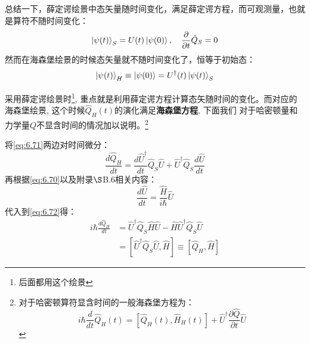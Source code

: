 \documentclass[a4paper,zihao=-4,linespread=1]{ctexrep}
\begin{document}
    总结一下，薛定谔绘景中态矢量随时间变化，满足薛定谔方程，而可观测量，也就是算符不随时间变化：
    \[\ket{\psi(t)}_S=U(t)\ket{\psi(0)},\quad \frac{\partial}{\partial t}\hat{Q}_S=0\]
    然而在海森堡绘景的时候态矢量就不随时间变化了，恒等于初始态：
    \[\ket{\psi(t)}_H\equiv \ket{\psi(0)}=U^\dagger(t)\ket{\psi(t)}_S\]
    
    采用薛定谔绘景时\footnote{后面都用这个绘景}, 重点就是利用薛定谔方程计算态矢随时间的变化。而对应的海森堡绘景, 这个时候$\hat{Q}_H(t)$的演化满足\textbf{海森堡方程}, 下面我们
    对于哈密顿量和力学量$Q$不显含时间的情况加以说明。\footnote{对于哈密顿算符显含时间的一般海森堡方程为：\[i \hbar \frac{d}{d t} \hat{Q}_{H}(t)=\left[\hat{Q}_{H}(t), \hat{H}_{H}(t)\right]+\hat{U}^{\dagger} \frac{\partial \hat{Q}}{\partial t} \hat{U}\]}

    将\ref{eq:6.71}两边对时间微分：
    \begin{equation}
        \label{eq:6.72}
        \frac{d\hat{Q}_H}{dt}=\frac{d\hat{U}^\dagger}{dt}\hat{Q}_S\hat{U}+\hat{U}^\dagger\hat{Q}_S\frac{d\hat{U}}{dt}
    \end{equation}
    再根据\ref{eq:6.70}以及附录$\S$B.6相关内容：
    \begin{equation}
        \frac{d\hat{U}}{dt}=\frac{\hat{H}}{i\hbar}\hat{U}
    \end{equation}
    代入到\ref{eq:6.72}得：
    \begin{align*}
        i\hbar\frac{d\hat{Q}_H}{dt}&=\hat{U}^\dagger\hat{Q}_S\hat{H}\hat{U}-\hat{H}\hat{U}^\dagger\hat{Q}_S\hat{U}\\
        &=\left[\hat{U}^\dagger\hat{Q}_S\hat{U},\hat{H}\right]\equiv\left[\hat{Q}_H,\hat{H}\right]
    \end{align*}
\end{document}
